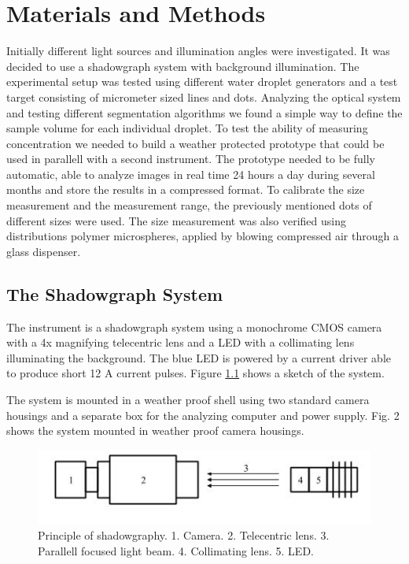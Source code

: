 
\chapter{Materials and Methods}
\label{chap:methods}

Initially different light sources and illumination angles were investigated. It was decided to use a shadowgraph system with background illumination. The experimental setup was tested using different water droplet generators and a test target consisting of micrometer sized lines and dots. Analyzing the optical system and testing different segmentation algorithms we found a simple way to define the sample volume for each individual droplet. To test the ability of measuring concentration we needed to build a weather protected prototype that could be used in parallell with a second instrument. The prototype needed to be fully automatic, able to analyze images in real time 24 hours a day during several months and store the results in a compressed format. To calibrate the size measurement and the measurement range, the previously mentioned dots of different sizes were used. The size measurement was also verified using distributions polymer microspheres, applied by blowing compressed air through a glass dispenser.


\section{The Shadowgraph System}

The instrument is a shadowgraph system using a monochrome CMOS camera with a 4x magnifying telecentric lens and a LED with a collimating lens illuminating the background. The blue LED is powered by a current driver able to produce short 12 A current pulses. Figure \cref{fig:shadowprinc} shows a sketch of the system. 

The system is mounted in a weather proof shell using two standard camera housings and a separate box for the analyzing computer and power supply. Fig. 2 shows the system mounted in weather proof camera housings. 

\begin{figure}[ht]
\centering\includegraphics[width=0.75\linewidth]{./figures/shadowprinc.jpg}
\caption{Principle of shadowgraphy. 1. Camera. 2. Telecentric lens. 3. Parallell focused light beam. 4. Collimating lens. 5. LED.}
\label{fig:shadowprinc}
\end{figure}

